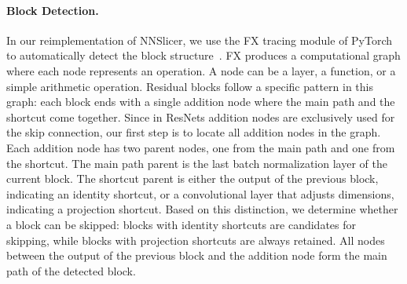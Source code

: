 \documentclass[
12pt,
fancyheadings,
a4paper,
twoside,
BCOR=0.7cm,
nobcorignoretitle,
grayscalebody,
]{stsreprt}
\begin{document}
\paragraph{Block Detection.}
In our reimplementation of NNSlicer, we use the FX tracing module of PyTorch to automatically
detect the block structure~\cite{paszke2019pytorch}.
FX produces a computational graph where each node represents an operation.
A node can be a layer, a function, or a simple arithmetic operation.
Residual blocks follow a specific pattern in this graph: each block ends with a single addition
node where the main path and the shortcut come together.
Since in ResNets addition nodes are exclusively used for the skip connection, our first step is to
locate all addition nodes in the graph.
Each addition node has two parent nodes, one from the main path and one from the shortcut.
The main path parent is the last batch normalization layer of the current block.
The shortcut parent is either the output of the previous block, indicating an identity shortcut, or
a convolutional layer that adjusts dimensions, indicating a projection shortcut.
Based on this distinction, we determine whether a block can be skipped: blocks with identity
shortcuts are candidates for skipping, while blocks with projection shortcuts are always retained.
All nodes between the output of the previous block and the addition node form the main path of the
detected block.
\end{document}
